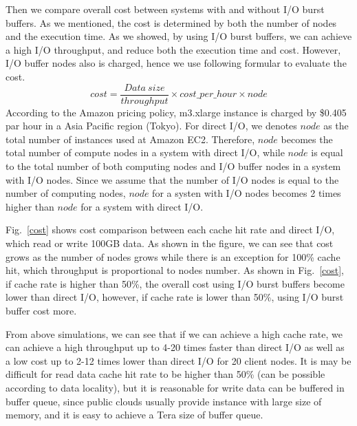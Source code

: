 Then we compare overall cost between systems with and without I/O burst buffers.
As we mentioned, the cost is  determined by both the number of nodes and the execution time. 
As we showed, by using I/O burst buffers, we can achieve a high I/O throughput, 
and reduce both the execution time and cost.
However, I/O buffer nodes also is charged, hence we use following formular to evaluate the cost.
\[cost=\frac{Data~size}{throughput}\times cost\_per\_hour\times node\]
According to the Amazon pricing policy, m3.xlarge instance is charged by \$0.405 par hour in a Asia Pacific region (Tokyo).
For direct I/O, we denotes $node$ as the total number of instances used at Amazon EC2. 
Therefore, $node$ becomes the total number of compute nodes in a system with direct I/O, while $node$ is equal to the total number of both computing nodes and I/O buffer nodes in a system with I/O nodes.
Since we assume that the number of I/O nodes is equal to the number of computing nodes, $node$ for a systen with I/O nodes becomes 2 times higher than $node$ for a system with direct I/O.

Fig.~\ref{cost} shows cost comparison between each cache hit rate and direct I/O, which read or write 100GB data.
As shown in the figure,  we can see that cost grows as the number of nodes grows while there is an exception for 100\% cache hit, which throughput is proportional to nodes number.
As shown in Fig.~\ref{cost}, if cache rate is higher than 50\%, the overall cost using I/O burst buffers become lower than direct I/O, however, if cache rate is lower than 50\%, using I/O burst buffer cost more.

From above simulations, we can see that if we can achieve a high cache rate, we can achieve a high throughput up to 4-20 times faster than direct I/O as well as a low cost up to 2-12 times lower than direct I/O for 20 client nodes.
It is may be difficult for read data cache hit rate to be higher than 50\% (can be possible according to data locality), but it is reasonable for write data can be buffered in buffer queue, since public clouds usually provide instance with large size of memory, and it is easy to achieve a Tera size of buffer queue.
